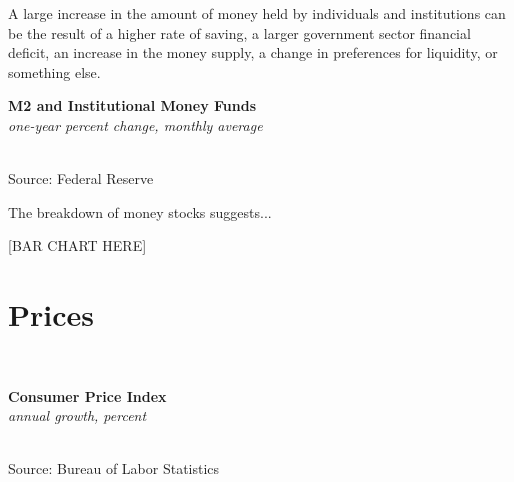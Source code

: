 \documentclass{report}
\makeatletter
\newcommand{\tbllink}[1]{\href{https://raw.githubusercontent.com/bdecon/US-chartbook/master/chartbook/data/#1}{\faTable}}
\newcommand*\short[1]{\expandafter\@gobbletwo\number\numexpr#1\relax}
\newcommand{\dateaxisticks}{
		date coordinates in=x, axis line style={draw=none},
		xmax={2020-02-01},
		max space between ticks=40,	    
		xtick={{1990-01-01}, {1992-01-01}, {1994-01-01}, 
			{1996-01-01}, {1998-01-01}, {2000-01-01}, 
			{2002-01-01}, {2004-01-01}, {2006-01-01},
			{2008-01-01}, {2010-01-01}, {2012-01-01}, {2014-01-01},
		    {2016-01-01}, {2018-01-01}, {2020-01-01}},
		minor xtick={{1989-01-01}, {1991-01-01}, {1993-01-01},
			{1995-01-01}, {1997-01-01}, {1999-01-01}, 
			{2001-01-01}, {2003-01-01}, {2005-01-01}, {2007-01-01},
		    {2009-01-01}, {2011-01-01}, {2013-01-01}, {2015-01-01},
		    {2017-01-01}, {2019-01-01}},
		enlarge y limits={0.06}, enlarge x limits={0.01},
		}
\newcommand{\bbar}[2]{extra #1 ticks = {{#2}}, extra #1 tick labels = ,
		extra #1 tick style = {grid=major, grid style={thick, black!25}},}
\newcommand{\stdline}[4]{\addplot[very thick, no markers, color=#1] 
		table [x=#2, y=#3, col sep=comma] {#4};	}
\newcommand{\thickline}[4]{\addplot[ultra thick, no markers, color=#1] 
		table [x=#2, y=#3, col sep=comma] {#4};	}
\newcommand{\rbars}{
		\fill[color=black!10] (axis cs:{1990-07-01},\pgfkeysvalueof{/pgfplots/ymin}) rectangle 
			(axis cs:{1991-03-01}, \pgfkeysvalueof{/pgfplots/ymax});
		\fill[color=black!10] (axis cs:{2007-12-01},\pgfkeysvalueof{/pgfplots/ymin}) rectangle 
			(axis cs:{2009-07-01}, \pgfkeysvalueof{/pgfplots/ymax});
		\fill[color=black!10] (axis cs:{2001-03-01},\pgfkeysvalueof{/pgfplots/ymin}) rectangle 
			(axis cs:{2001-11-01}, \pgfkeysvalueof{/pgfplots/ymax});}
\makeatother
\begin{document}
{{{{\begin{minipage}{0.76\textwidth}
A large increase in the amount of money held by individuals and institutions can be the result of a higher rate of saving, a larger government sector financial deficit, an increase in the money supply, a change in preferences for liquidity, or something else. \\

\vspace{2mm}

\noindent \normalsize \textbf{M2 and Institutional Money Funds}\\
\footnotesize{\textit{one-year percent change, monthly average}}\\ 
\noindent \hspace*{-2mm} \\
\footnotesize{Source: Federal Reserve} \hfill \tbllink{M2imf.csv}\\

\vspace{4mm}

\small The breakdown of money stocks suggests... \\

\vspace{2mm}

\normalsize [BAR CHART HERE] 


\end{minipage}

\newpage

\begin{minipage}{0.76\textwidth}
\section*{\color{darkgray}\LARGE \seriffont Prices}
\label{sec:pr}

\small  \\

\vspace{2mm}

\noindent \normalsize \textbf{Consumer Price Index}\\
\footnotesize{\textit{annual growth, percent}}\\ 
\noindent \hspace*{-2mm} \\
\footnotesize{Source: Bureau of Labor Statistics} \hfill \tbllink{cpi.csv}


\end{minipage}}}}}
\end{document}
